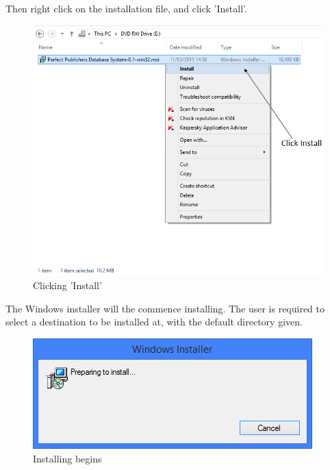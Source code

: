 Then right click on the installation file, and click 'Install'.

\begin{figure}[H]
    \includegraphics[width=\textwidth]{./Manual/Installation/Install.png}
    \caption{Clicking 'Install'}
\end{figure}

The Windows installer will the commence installing. The user is required to select a destination to be installed at, with the default directory given.

\begin{figure}[H]
    \includegraphics[width=\textwidth]{./Manual/Installation/PrepareInstall.png}
    \caption{Installing begins}
\end{figure}

